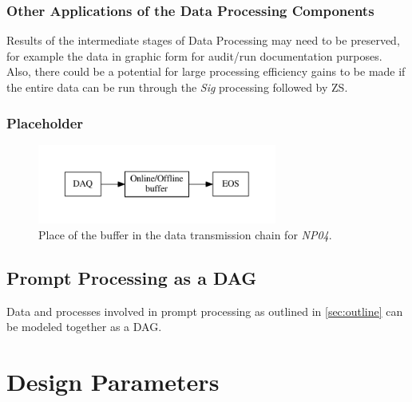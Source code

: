 \documentclass[pdftex,12pt,letter]{article}
\newcommand{\expname}{\textit{NP04}\xspace}
\begin{document}
\subsubsection{Other Applications of the Data Processing Components}
Results of the intermediate stages of Data Processing may need to be preserved, for
example the data in graphic form for audit/run documentation purposes.
Also, there could be a potential for large processing efficiency
gains to be made if the entire data can be run through the \textit{Sig} processing followed by ZS.


\subsubsection{Placeholder}
\begin{figure}[tbh]
  \centering
  \includegraphics[width=0.7\textwidth]{figures/big-picture.pdf}
  \caption{Place of the buffer in the data transmission chain for \expname.}
  \label{fig:big-picture}
\end{figure}

\subsection{Prompt Processing as a DAG}
\label{sec:dag}
Data and processes involved in prompt processing as outlined in \ref{sec:outline} can be
modeled together as a DAG.


\section{Design Parameters}
\end{document}
